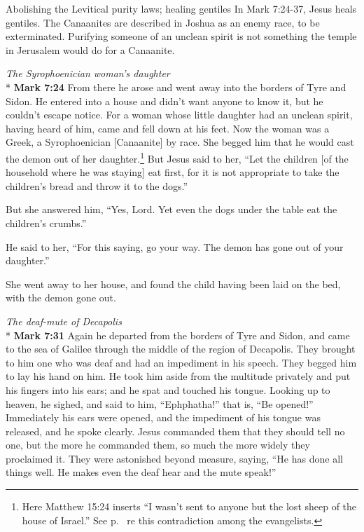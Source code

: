 \documentclass[10pt,twoside]{article} %
\newcommand{\quotesize}{\normalsize{}}
\newcommand{\comm}[1]{\begingroup \color{black!50} #1\endgroup}
\newenvironment{quotetext}{\begingroup\quotesize}{\endgroup}
\newcommand{\intex}[1]{\index[texts]{#1}}
\newcommand{\bible}[2]{\begin{quotetext}\textbf{#1}\intex{#1} #2\end{quotetext}}
\newcommand{\gospelmark}[2]{\bible{Mark #1}{#2}}
\newcommand{\subhead}[1]{\emph{#1}\\*}
\begin{document}
\begin{section}{Abolishing the Levitical purity laws; healing gentiles}
\comm{
In Mark 7:24-37, Jesus heals gentiles. The Canaanites are described in Joshua as an enemy race, to be exterminated. Purifying someone
of an unclean spirit is not something the temple in Jerusalem would do for a Canaanite.
}

\subhead{The Syrophoenician woman's daughter}\label{canaanite-woman}
\gospelmark{7:24}{
  From there he arose and went away into the borders of Tyre and Sidon. He entered into a house and didn't want anyone to know it, but he couldn't escape notice.   For a woman whose little daughter had an unclean spirit, having heard of him, came and fell down at his feet.   Now the woman was a Greek, a Syrophoenician [Canaanite] by race. She begged him that he would cast the demon out of her daughter.\footnote{Here Matthew 15:24 inserts ``I wasn't sent to anyone but the lost sheep of the house of Israel.'' See p.~\pageref{gentile-evangelists-disagree} re this contradiction among the evangelists.}   But Jesus said to her, ``Let the children
[of the household where he was staying] eat first, for it is not appropriate to take the children's bread and throw it to the dogs.''


  But she answered him, ``Yes, Lord. Yet even the dogs under the table eat the children's crumbs.''

  He said to her, ``For this saying, go your way. The demon has gone out of your daughter.''

  She went away to her house, and found the child having been laid on the bed, with the demon gone out.
}

\subhead{The deaf-mute of Decapolis}
\gospelmark{7:31}{
  Again he departed from the borders of Tyre and Sidon, and came to the sea of Galilee through the middle of the region of Decapolis.   They brought to him one who was deaf and had an impediment in his speech. They begged him to lay his hand on him.   He took him aside from the multitude privately and put his fingers into his ears; and he spat and touched his tongue.   Looking up to heaven, he sighed, and said to him, ``Ephphatha!'' that is, ``Be opened!''   Immediately his ears were opened, and the impediment of his tongue was released, and he spoke clearly.   Jesus commanded them that they should tell no one, but the more he commanded them, so much the more widely they proclaimed it.   They were astonished beyond measure, saying, ``He has done all things well. He makes even the deaf hear and the mute speak!''
}




\end{section}
\end{document}
